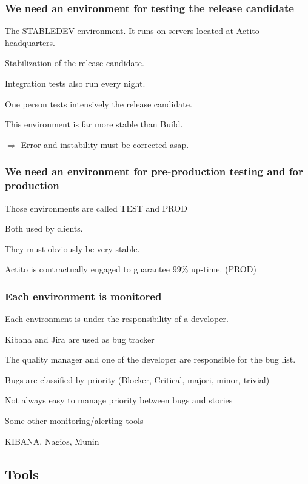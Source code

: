 \documentclass[a4paper, 11pt]{article}
\begin{document}
    \subsubsection{We need an environment for testing the release candidate}


    The STABLEDEV environment. It runs on servers located at Actito headquarters.

    Stabilization of the release candidate.

    Integration tests also run every night.

    One person tests intensively the release candidate.

    This environment is far more stable than Build.

    $\Rightarrow$ Error and instability must be corrected asap.

    \subsubsection{We need an environment for pre-production testing and for production}

    Those environments are called TEST and PROD

    Both used by clients.

    They must obviously be very stable.

    Actito is contractually engaged to guarantee 99\% up-time. (PROD)

    \subsubsection{Each environment is monitored}

    Each environment is under the responsibility of a developer.

    Kibana and Jira are used as bug tracker

    The quality manager and one of the developer are responsible for the bug list.

    Bugs are classified by priority (Blocker, Critical, majori, minor, trivial)

    Not always easy to manage priority between bugs and stories

    Some other monitoring/alerting tools

    KIBANA, Nagios, Munin

    \subsection{Tools}
\end{document}
